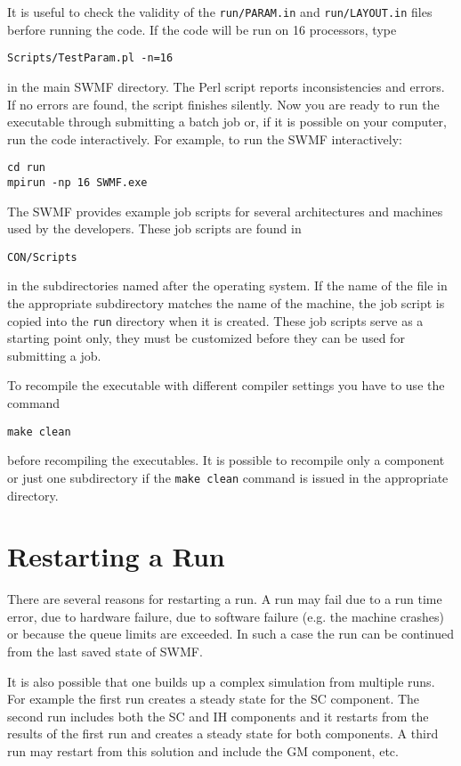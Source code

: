 It is useful to check the validity of the {\tt run/PARAM.in} and 
{\tt run/LAYOUT.in} files berfore running the code. If the
code will be run on 16 processors, type
\begin{verbatim}
Scripts/TestParam.pl -n=16
\end{verbatim}
in the main SWMF directory.
The Perl script reports inconsistencies and errors. 
If no errors are found, the script finishes silently.
Now you are ready to run the executable through submitting a batch job or, 
if it is possible on your computer, run the code interactively.  For
example, to run the SWMF interactively:
\begin{verbatim}
cd run
mpirun -np 16 SWMF.exe
\end{verbatim}
The SWMF provides example job scripts for several architectures and
machines used by the developers. These job scripts are found in 
\begin{verbatim}
CON/Scripts
\end{verbatim}
in the subdirectories named after the operating system. If the name
of the file in the appropriate subdirectory matches the 
name of the machine, the job script is copied into
the {\tt run} directory when it is created.
These job scripts serve as a starting point only, they must
be customized before they can be used for submitting a job.

To recompile the executable with different compiler settings you have
to use the command
\begin{verbatim}
make clean
\end{verbatim}
before recompiling the executables. It is possible to recompile
only a component or just one subdirectory if the {\tt make clean}
command is issued in the appropriate directory.

\section{Restarting a Run}

There are several reasons for restarting a run. A run may fail
due to a run time error, due to hardware failure, due to 
software failure (e.g. the machine crashes) or because the
queue limits are exceeded. In such a case the run can be continued from
the last saved state of SWMF. 

It is also possible that one builds up a complex simulation from multiple 
runs. For example the first run creates a steady state for the SC component.
The second run includes both the SC and IH components and it 
restarts from the results of the first run and creates a steady state
for both components. A third run may restart from this solution and include
the GM component, etc. 

